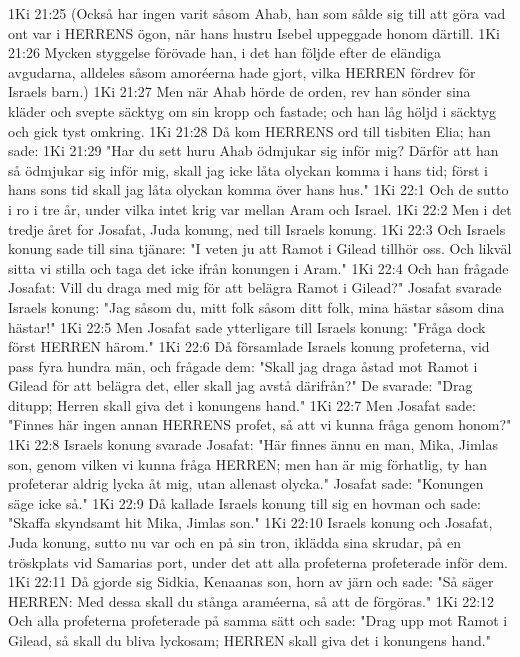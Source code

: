 1Ki 21:25  (Också har ingen varit såsom Ahab, han som sålde sig till att göra vad ont var i HERRENS ögon, när hans hustru Isebel uppeggade honom därtill.
1Ki 21:26  Mycken styggelse förövade han, i det han följde efter de eländiga avgudarna, alldeles såsom amoréerna hade gjort, vilka HERREN fördrev för Israels barn.)
1Ki 21:27  Men när Ahab hörde de orden, rev han sönder sina kläder och svepte säcktyg om sin kropp och fastade; och han låg höljd i säcktyg och gick tyst omkring.
1Ki 21:28  Då kom HERRENS ord till tisbiten Elia; han sade:
1Ki 21:29  "Har du sett huru Ahab ödmjukar sig inför mig? Därför att han så ödmjukar sig inför mig, skall jag icke låta olyckan komma i hans tid; först i hans sons tid skall jag låta olyckan komma över hans hus."
1Ki 22:1  Och de sutto i ro i tre år, under vilka intet krig var mellan Aram och Israel.
1Ki 22:2  Men i det tredje året for Josafat, Juda konung, ned till Israels konung.
1Ki 22:3  Och Israels konung sade till sina tjänare: "I veten ju att Ramot i Gilead tillhör oss. Och likväl sitta vi stilla och taga det icke ifrån konungen i Aram."
1Ki 22:4  Och han frågade Josafat: Vill du draga med mig för att belägra Ramot i Gilead?" Josafat svarade Israels konung: "Jag såsom du, mitt folk såsom ditt folk, mina hästar såsom dina hästar!"
1Ki 22:5  Men Josafat sade ytterligare till Israels konung: "Fråga dock först HERREN härom."
1Ki 22:6  Då församlade Israels konung profeterna, vid pass fyra hundra män, och frågade dem: "Skall jag draga åstad mot Ramot i Gilead för att belägra det, eller skall jag avstå därifrån?" De svarade: "Drag ditupp; Herren skall giva det i konungens hand."
1Ki 22:7  Men Josafat sade: "Finnes här ingen annan HERRENS profet, så att vi kunna fråga genom honom?"
1Ki 22:8  Israels konung svarade Josafat: "Här finnes ännu en man, Mika, Jimlas son, genom vilken vi kunna fråga HERREN; men han är mig förhatlig, ty han profeterar aldrig lycka åt mig, utan allenast olycka." Josafat sade: "Konungen säge icke så."
1Ki 22:9  Då kallade Israels konung till sig en hovman och sade: "Skaffa skyndsamt hit Mika, Jimlas son."
1Ki 22:10  Israels konung och Josafat, Juda konung, sutto nu var och en på sin tron, iklädda sina skrudar, på en tröskplats vid Samarias port, under det att alla profeterna profeterade inför dem.
1Ki 22:11  Då gjorde sig Sidkia, Kenaanas son, horn av järn och sade: "Så säger HERREN: Med dessa skall du stånga araméerna, så att de förgöras."
1Ki 22:12  Och alla profeterna profeterade på samma sätt och sade: "Drag upp mot Ramot i Gilead, så skall du bliva lyckosam; HERREN skall giva det i konungens hand."
